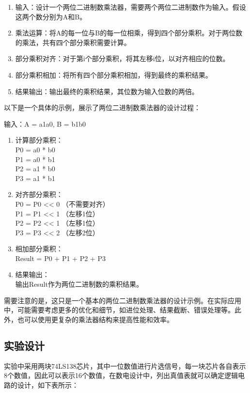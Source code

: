 \documentclass[UTF8,12pt]{article}
\begin{document}
\begin{enumerate}
    \item 输入：设计一个两位二进制数乘法器，需要两个两位二进制数作为输入。假设这两个数分别为A和B。
    \item 乘法运算：将A的每一位与B的每一位相乘，得到四个部分乘积。对于两位数的乘法，共有四个部分乘积需要计算。
    \item 部分乘积对齐：对于第i个部分乘积，将其左移i位，以对齐相应的位数。
    \item 部分乘积相加：将所有四个部分乘积相加，得到最终的乘积结果。
    \item 结果输出：输出最终的乘积结果，其位数为输入位数的两倍。
\end{enumerate}

以下是一个具体的示例，展示了两位二进制数乘法器的设计过程：

输入：A = a1a0, B = b1b0

\begin{enumerate}
    \item 计算部分乘积：\\ P0 = a0 * b0\\ P1 = a0 * b1\\ P2 = a1 * b0\\ P3 = a1 * b1
    \item 对齐部分乘积：\\ P0 = P0 << 0 （不需要对齐）\\ P1 = P1 << 1 （左移1位）\\ P2 = P2 << 1 （左移1位）\\ P3 = P3 << 2 （左移2位）
    \item 相加部分乘积：\\ Result = P0 + P1 + P2 + P3
    \item 结果输出：\\ 输出Result作为两位二进制数的乘积结果。
\end{enumerate}

需要注意的是，这只是一个基本的两位二进制数乘法器的设计示例。在实际应用中，可能需要考虑更多的优化和细节，如进位处理、结果截断、错误处理等。此外，也可以使用更复杂的乘法器结构来提高性能和效率。

\newpage

\subsection{实验设计}
实验中采用两块74LS138芯片，其中一位数值进行片选信号，每一块芯片各自表示8个数值，因此可以表示16个数值，在数电设计中，列出真值表就可以确定逻辑电路的设计，如下表所示：
\end{document}
